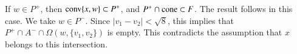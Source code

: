 \begin{tarskidata}
\begin{tarski}
\begin{proved}
If $w\in P^+$, then ${\operatorname{conv}}\{x,w\}\subset P^+$, and
$P^+\cap {\operatorname{cone}} \subset F$.  The result follows in this case.
We take $w\in P^-$.  Since $|v_1-v_2|<\sqrt8$, 
this implies that $P^+\cap A^-\cap \Omega(w,\{v_1,v_2\})$
is empty.  This contradicts the assumption that $x$ belongs to this
intersection.
%
%
%
%
%
%
% 
\swallowed\end{proved}
\end{tarski}

 



\begin{tarski}


\end{tarski}
\end{tarskidata}
